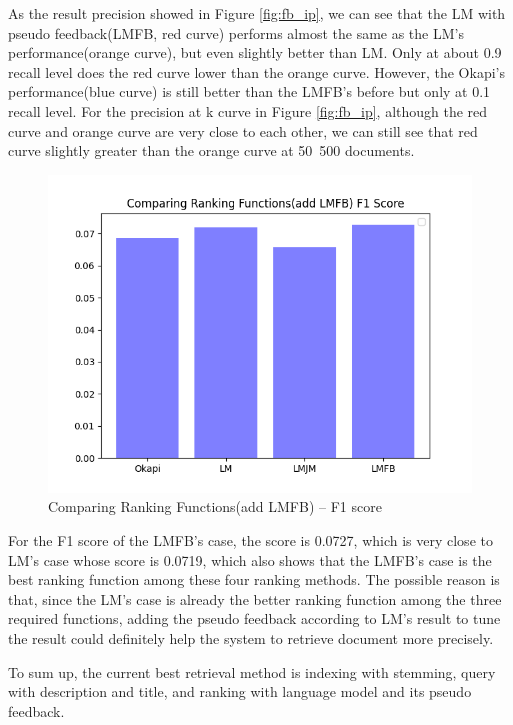 \documentclass[10pt, a4paper]{article}
\begin{document}
As the result precision showed in Figure \ref{fig:fb_ip}, we can see that the LM with pseudo feedback(LMFB, red curve) performs almost the same as the LM's performance(orange curve), but even slightly better than LM. Only at about 0.9 recall level does the red curve lower than the orange curve. However, the Okapi's performance(blue curve) is still better than the LMFB's before but only at 0.1 recall level. For the precision at k curve in Figure \ref{fig:fb_ip}, although the red curve and orange curve are very close to each other, we can still see that red curve slightly greater than the orange curve at 50~500 documents.

\begin{figure}[h!]
\centering
\includegraphics[scale=0.5]{add LMFB/Comparing Ranking Functions(add LMFB) F1 Score.png}
\caption{Comparing Ranking Functions(add LMFB) -- F1 score}
\label{fig:fb_f}
\end{figure}

For the F1 score of the LMFB's case, the score is 0.0727, which is very close to LM's case whose score is 0.0719, which also shows that the LMFB's case is the best ranking function among these four ranking methods. The possible reason is that, since the LM's case is already the better ranking function among the three required functions, adding the pseudo feedback according to LM's result to tune the result could definitely help the system to retrieve document more precisely.

To sum up, the current best retrieval method is indexing with stemming, query with description and title, and ranking with language model and its pseudo feedback.
\end{document}
